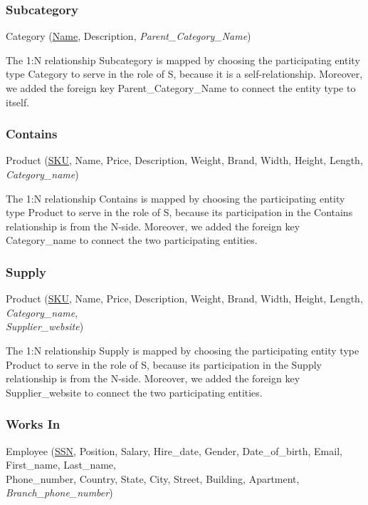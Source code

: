 \documentclass[11pt]{article}
\begin{document}
\subsubsection{Subcategory}

Category (\underline{Name}, Description, \textit{Parent\_Category\_Name})

The 1:N relationship Subcategory is mapped by choosing the participating entity type Category to serve in the role of S, because it is a self-relationship. Moreover, we added the foreign key Parent\_Category\_Name to connect the entity type to itself.

\subsubsection{Contains}

Product (\underline{SKU}, Name, Price, Description, Weight, Brand, Width, Height, Length, \textit{Category\_name})

The 1:N relationship Contains is mapped by choosing the participating entity type Product to serve in the role of S, because its participation in the Contains relationship is from the N-side. Moreover, we added the foreign key Category\_name to connect the two participating entities.

\subsubsection{Supply}

Product (\underline{SKU}, Name, Price, Description, Weight, Brand, Width, Height, Length, \textit{Category\_name}, \\
\textit{Supplier\_website})

The 1:N relationship Supply is mapped by choosing the participating entity type Product to serve in the role of S, because its participation in the Supply relationship is from the N-side. Moreover, we added the foreign key Supplier\_website to connect the two participating entities.

\subsubsection{Works In}

Employee (\underline{SSN}, Position, Salary, Hire\_date, Gender, Date\_of\_birth, Email, First\_name, Last\_name,\\
Phone\_number, Country, State, City, Street, Building, Apartment, \textit{Branch\_phone\_number})
\end{document}
